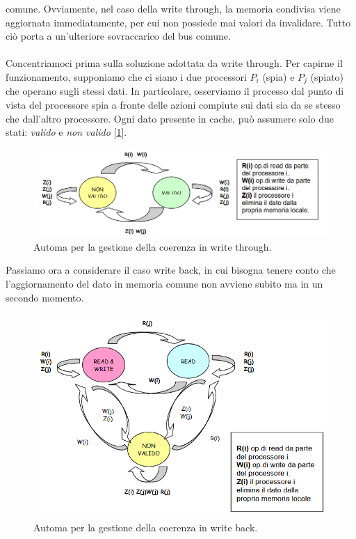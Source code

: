 comune. Ovviamente, nel caso della write through, la memoria condivisa viene aggiornata immediatamente, per cui non possiede mai valori da invalidare. Tutto ciò porta a un'ulteriore sovraccarico del bus comune.
\\
\\
Concentriamoci prima sulla soluzione adottata da write through. Per capirne il funzionamento, supponiamo che ci siano i due processori \(P_i\) (spia) e \(P_j\) (spiato) che operano sugli stessi dati. In particolare, osserviamo il processo dal punto di vista del processore spia a fronte delle azioni compiute sui dati sia da se stesso che dall'altro processore. Ogni dato presente in cache, può assumere solo due stati: \textit{valido} e \textit{non valido} [\ref{fig:automa-wt}].
\begin{figure}[!h]
    \centering
    \includegraphics[width=0.55\linewidth]{img/automa_wt.png}
    \caption{Automa per la gestione della coerenza in write through.}
    \label{fig:automa-wt}
\end{figure}
Passiamo ora a considerare il caso write back, in cui bisogna tenere conto che l'aggiornamento del dato in
memoria comune non avviene subito ma in un secondo momento.  
\begin{figure}[!h]
    \centering
    \includegraphics[width=0.55\linewidth]{img/automa-wb.png}
    \caption{Automa per la gestione della coerenza in write back.}
    \label{fig:automa-wb}
\end{figure}

